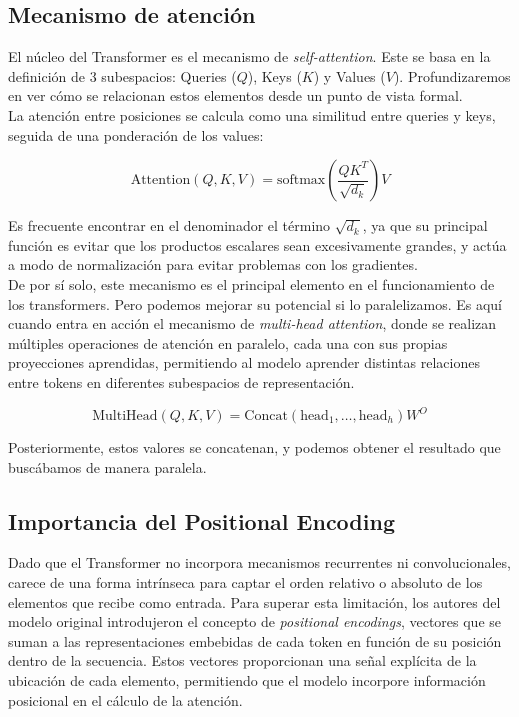 \subsection{Mecanismo de atención}

El núcleo del Transformer es el mecanismo de \textit{self-attention}. Este se basa en la definición de 3 subespacios: Queries ($Q$), Keys ($K$) y Values ($V$). Profundizaremos en ver cómo se relacionan estos elementos desde un punto de vista formal.\\

La atención entre posiciones se calcula como una similitud entre queries y keys, seguida de una ponderación de los values:

\begin{equation}
	\text{Attention}(Q, K, V) = \text{softmax} \left( \frac{QK^T}{\sqrt{d_k}} \right)V
\end{equation}

Es frecuente encontrar en el denominador el término $\sqrt{d_k}$, ya que su principal función es evitar que los productos escalares sean excesivamente grandes, y actúa a modo de normalización para evitar problemas con los gradientes.\\

De por sí solo, este mecanismo es el principal elemento en el funcionamiento de los transformers. Pero podemos mejorar su potencial si lo paralelizamos. Es aquí cuando entra en acción el mecanismo de \textit{multi-head attention}, donde se realizan múltiples operaciones de atención en paralelo, cada una con sus propias proyecciones aprendidas, permitiendo al modelo aprender distintas relaciones entre tokens en diferentes subespacios de representación. 

\begin{equation}
	\text{MultiHead}(Q, K, V) = \text{Concat}(\text{head}_1, \ldots, \text{head}_h)W^O
\end{equation}

Posteriormente, estos valores se concatenan, y podemos obtener el resultado que buscábamos de manera paralela.


\subsection{Importancia del Positional Encoding}

Dado que el Transformer no incorpora mecanismos recurrentes ni convolucionales, carece de una forma intrínseca para captar el orden relativo o absoluto de los elementos que recibe como entrada. Para superar esta limitación, los autores del modelo original introdujeron el concepto de \textit{positional encodings}, vectores que se suman a las representaciones embebidas de cada token en función de su posición dentro de la secuencia. Estos vectores proporcionan una señal explícita de la ubicación de cada elemento, permitiendo que el modelo incorpore información posicional en el cálculo de la atención.\\

